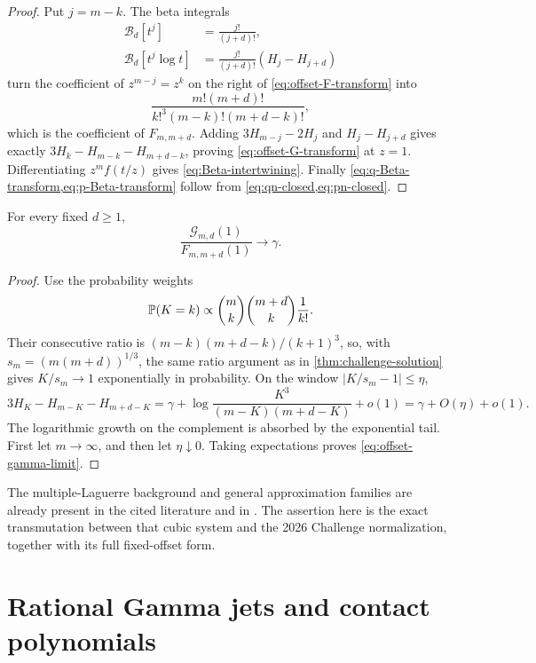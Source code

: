 \begin{proof}
Put \(j=m-k\).  The beta integrals
\begin{align*}
 \mathcal B_d[t^j]&=\frac{j!}{(j+d)!},\\
 \mathcal B_d[t^j\log t]&=\frac{j!}{(j+d)!}(H_j-H_{j+d})
\end{align*}
turn the coefficient of \(z^{m-j}=z^k\) on the right of
\eqref{eq:offset-F-transform} into
\[
 \frac{m!(m+d)!}{k!^3(m-k)!(m+d-k)!},
\]
which is the coefficient of \(F_{m,m+d}\).  Adding
\(3H_{m-j}-2H_j\) and \(H_j-H_{j+d}\) gives exactly
\(3H_k-H_{m-k}-H_{m+d-k}\), proving
\eqref{eq:offset-G-transform} at \(z=1\).  Differentiating
\(z^mf(t/z)\) gives
\eqref{eq:Beta-intertwining}.  Finally
\cref{eq:q-Beta-transform,eq:p-Beta-transform} follow from
\cref{eq:qn-closed,eq:pn-closed}.
\end{proof}

\begin{corollary}
\label{cor:offset-ladder}
For every fixed \(d\ge1\),
\begin{equation}\label{eq:offset-gamma-limit}
 \boxed{\displaystyle
 \frac{\mathcal G_{m,d}(1)}{F_{m,m+d}(1)}\longrightarrow\gamma.}
\end{equation}
\end{corollary}

\begin{proof}
Use the probability weights
\[
 \mathbb P(K=k)\propto\binom mk\binom{m+d}k\frac1{k!}.
\]
Their consecutive ratio is
\((m-k)(m+d-k)/(k+1)^3\), so, with
\(s_m=(m(m+d))^{1/3}\), the same ratio argument as in
\cref{thm:challenge-solution} gives \(K/s_m\to1\) exponentially in
probability.  On the window \(|K/s_m-1|\le\eta\),
\[
 3H_K-H_{m-K}-H_{m+d-K}
 =\gamma+\log\frac{K^3}{(m-K)(m+d-K)}+o(1)
 =\gamma+O(\eta)+o(1).
\]
The logarithmic growth on the complement is absorbed by the exponential
tail.  First let \(m\to\infty\), and then let \(\eta\downarrow0\).
Taking expectations proves \eqref{eq:offset-gamma-limit}.
\end{proof}

The multiple-Laguerre background and general approximation families are
already present in the cited literature and in
\cite{WolfsVanAssche2025}.  The assertion here is the exact transmutation
between that cubic system and the 2026 Challenge normalization, together
with its full fixed-offset form.

\section{Rational Gamma jets and contact polynomials}
\label{sec:gamma-jets}

